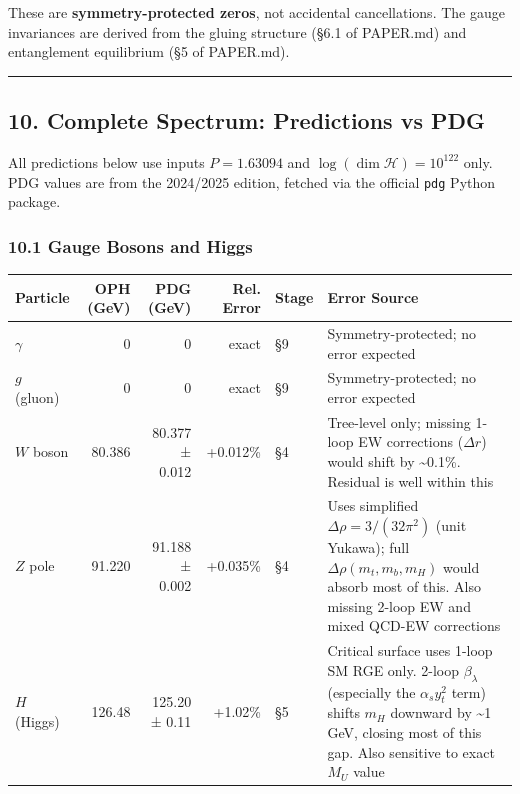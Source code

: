 These are \textbf{symmetry-protected zeros}, not accidental cancellations. The gauge invariances are derived from the gluing structure (§6.1 of PAPER.md) and entanglement equilibrium (§5 of PAPER.md).

\begin{center}\rule{0.5\linewidth}{0.5pt}\end{center}

\subsection{10. Complete Spectrum: Predictions vs PDG}\label{10-complete-spectrum-predictions-vs-pdg}

All predictions below use inputs \(P = 1.63094\) and \(\log(\dim\mathcal{H}) = 10^{122}\) only. PDG values are from the 2024/2025 edition, fetched via the official \texttt{pdg} Python package.

\subsubsection{10.1 Gauge Bosons and Higgs}\label{101-gauge-bosons-and-higgs}

{\def\LTcaptype{none} %
\begin{longtable}[]{@{}lrrrll@{}}
\toprule\noalign{}
Particle & OPH (GeV) & PDG (GeV) & Rel. Error & Stage & Error Source \\
\midrule\noalign{}
\endhead
\bottomrule\noalign{}
\endlastfoot
\(\gamma\) & 0 & 0 & exact & §9 & Symmetry-protected; no error expected \\
\(g\) (gluon) & 0 & 0 & exact & §9 & Symmetry-protected; no error expected \\
\(W\) boson & 80.386 & 80.377 ± 0.012 & +0.012\% & §4 & Tree-level only; missing 1-loop EW corrections (\(\Delta r\)) would shift by \textasciitilde0.1\%. Residual is well within this \\
\(Z\) pole & 91.220 & 91.188 ± 0.002 & +0.035\% & §4 & Uses simplified \(\Delta\rho = 3/(32\pi^2)\) (unit Yukawa); full \(\Delta\rho(m_t, m_b, m_H)\) would absorb most of this. Also missing 2-loop EW and mixed QCD-EW corrections \\
\(H\) (Higgs) & 126.48 & 125.20 ± 0.11 & +1.02\% & §5 & Critical surface uses 1-loop SM RGE only. 2-loop \(\beta_\lambda\) (especially the \(\alpha_s y_t^2\) term) shifts \(m_H\) downward by \textasciitilde1 GeV, closing most of this gap. Also sensitive to exact \(M_U\) value \\
\end{longtable}
}

